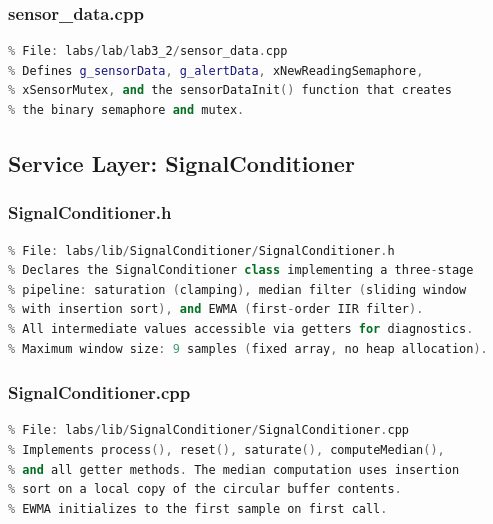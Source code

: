 \subsubsection{sensor\_data.cpp}
\begin{lstlisting}[language=C++, caption=sensor\_data.cpp --- Shared State Definitions, label=lst:appendix_sensor_data_cpp]
% [Full source code - see GitHub repository]
% File: labs/lab/lab3_2/sensor_data.cpp
% Defines g_sensorData, g_alertData, xNewReadingSemaphore,
% xSensorMutex, and the sensorDataInit() function that creates
% the binary semaphore and mutex.
\end{lstlisting}

\subsection{Service Layer: SignalConditioner}

\subsubsection{SignalConditioner.h}
\begin{lstlisting}[language=C++, caption=SignalConditioner.h --- Signal Conditioning Pipeline Interface, label=lst:appendix_signal_conditioner_h]
% [Full source code - see GitHub repository]
% File: labs/lib/SignalConditioner/SignalConditioner.h
% Declares the SignalConditioner class implementing a three-stage
% pipeline: saturation (clamping), median filter (sliding window
% with insertion sort), and EWMA (first-order IIR filter).
% All intermediate values accessible via getters for diagnostics.
% Maximum window size: 9 samples (fixed array, no heap allocation).
\end{lstlisting}

\subsubsection{SignalConditioner.cpp}
\begin{lstlisting}[language=C++, caption=SignalConditioner.cpp --- Signal Conditioning Pipeline Implementation, label=lst:appendix_signal_conditioner_cpp]
% [Full source code - see GitHub repository]
% File: labs/lib/SignalConditioner/SignalConditioner.cpp
% Implements process(), reset(), saturate(), computeMedian(),
% and all getter methods. The median computation uses insertion
% sort on a local copy of the circular buffer contents.
% EWMA initializes to the first sample on first call.
\end{lstlisting}

